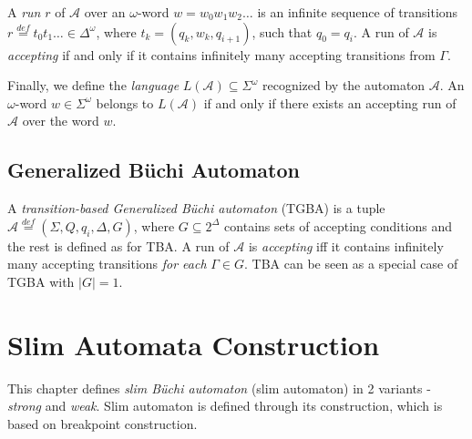 \documentclass[
	digital
nolof, nolot
]{fithesis3}
\newcommand{\cA}{\mathcal{A}}
\newcommand{\lA}{L(\cA)}
\newcommand{\eqdef}{\overset{def}{=}}
\begin{document}
			A \emph{run} $r$ of $\cA$ over an $\omega$-word $w=w_0w_1w_2\ldots$ is an infinite sequence of transitions
			$r\eqdef t_0t_1\ldots\in\Delta^\omega$, where $t_k=(q_k, w_k,q_{i+1})$,
			 such that $q_0=q_i$.
			A run of $\cA$ is \emph{accepting} if and only if it contains infinitely many accepting transitions from $\Gamma$.

			Finally, we define the \emph{language} $\lA \subseteq \Sigma^\omega$ recognized by the automaton $\cA$. An $\omega$-word $w \in \Sigma^\omega$ belongs to $\lA$ if and only if there exists an accepting run of $\cA$ over the word $w$. 
			
			
		\section{Generalized Büchi Automaton}
		A \emph{transition-based Generalized Büchi automaton} (TGBA) is a tuple $\cA\eqdef(\Sigma, Q, q_i, \Delta, G)$, where $G \subseteq 2^\Delta$ contains sets of accepting conditions and the rest is defined as for TBA. A run of $\cA$ is \emph{accepting} iff it contains infinitely many accepting transitions \emph{for each} $\Gamma \in G$. TBA can be seen as a special case of TGBA with $|G|=1$.
		
		
			
			
			
			\chapter{Slim Automata Construction}\label{section:slim}
			
			
			
			
			
			
			
			
			
			
			This chapter defines \emph{slim Büchi automaton} (slim automaton) in 2 variants - \emph{strong} and \emph{weak}. Slim automaton is defined through its construction, which is based on breakpoint construction. 
			
\end{document}
